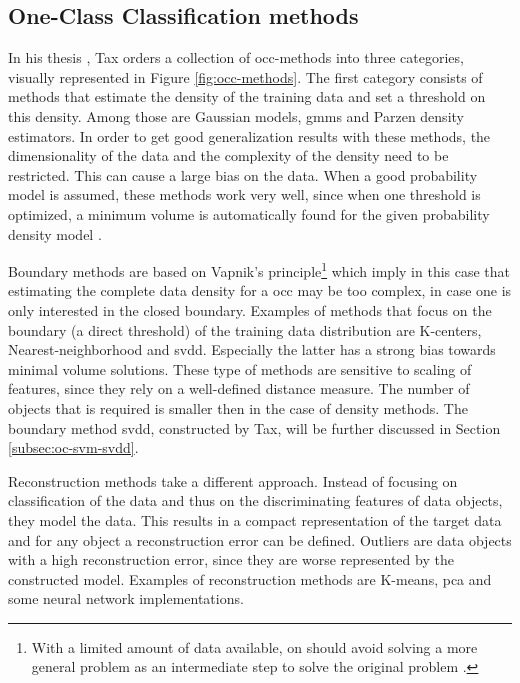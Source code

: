 \subsection{One-Class Classification methods}\label{subsec:occ-methods}
In his thesis \cite{tax2001one}, Tax orders a collection of \gls{occ}-methods into three categories, visually represented in Figure \ref{fig:occ-methods}.
The first category consists of methods that estimate the density of the training data and set a threshold on this density.
Among those are Gaussian models, \glspl{gmm} and Parzen density estimators.
In order to get good generalization results with these methods, the dimensionality of the data and the complexity of the density need to be restricted.
This can cause a large bias on the data.
When a good probability model is assumed, these methods work very well, since when one threshold is optimized, a minimum volume is automatically found for the given probability density model \cite{tax2001one}.

Boundary methods are based on Vapnik's principle\footnote{With a limited amount of data available, on should avoid solving a more general problem as an intermediate step to solve the original problem \cite{vapnik1998statistical}.} which imply in this case that estimating the complete data density for a \gls{occ} may be too complex, in case one is only interested in the closed boundary.
Examples of methods that focus on the boundary (a direct threshold) of the training data distribution are K-centers, Nearest-neighborhood and \gls{svdd}.
Especially the latter has a strong bias towards minimal volume solutions.
These type of methods are sensitive to scaling of features, since they rely on a well-defined distance measure.
The number of objects that is required is smaller then in the case of density methods.
The boundary method \gls{svdd}, constructed by Tax, will be further discussed in Section \ref{subsec:oc-svm-svdd}.

Reconstruction methods take a different approach.
Instead of focusing on classification of the data and thus on the discriminating features of data objects, they model the data.
This results in a compact representation of the target data and for any object a reconstruction error can be defined.
Outliers are data objects with a high reconstruction error, since they are worse represented by the constructed model.
Examples of reconstruction methods are K-means, \gls{pca} and some neural network implementations.


